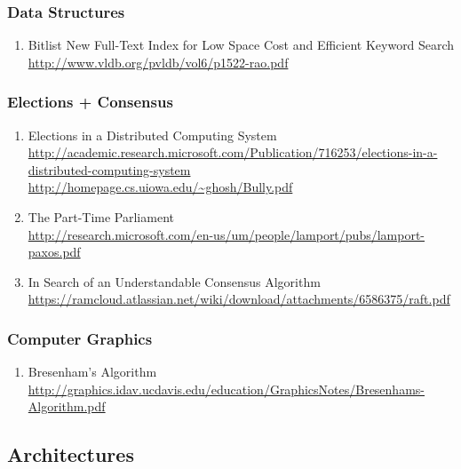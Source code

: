\documentclass{article}
\begin{document}
\subsubsection{Data Structures}
\begin{enumerate}
\item {Bitlist New Full-Text Index for Low Space Cost and Efficient Keyword Search\\
\url{http://www.vldb.org/pvldb/vol6/p1522-rao.pdf}}
\end{enumerate}

\subsubsection{Elections + Consensus}

\begin{enumerate}
	\item {Elections in a Distributed Computing System\\
\href{http://academic.research.microsoft.com/Publication/716253/elections-in-a-distributed-computing-system}{http://academic.research.microsoft.com/Publication/716253/elections-in-a-distributed-computing-system}\\
\url{http://homepage.cs.uiowa.edu/~ghosh/Bully.pdf}}
	\item {The Part-Time Parliament\\
\href{http://research.microsoft.com/en-us/um/people/lamport/pubs/lamport-paxos.pdf}{http://research.microsoft.com/en-us/um/people/lamport/pubs/lamport-paxos.pdf}}
	\item {In Search of an Understandable Consensus Algorithm\\
\href{https://ramcloud.atlassian.net/wiki/download/attachments/6586375/raft.pdf}{https://ramcloud.atlassian.net/wiki/download/attachments/6586375/raft.pdf}}
\end{enumerate}

\subsubsection{Computer Graphics}
\begin{enumerate}
	\item {Bresenham's Algorithm\\
\url{http://graphics.idav.ucdavis.edu/education/GraphicsNotes/Bresenhams-Algorithm.pdf}}
\end{enumerate}

\subsection{Architectures}
\end{document}

